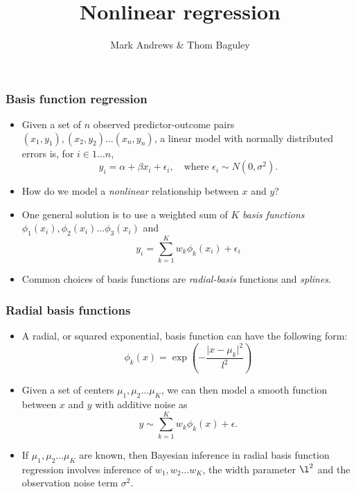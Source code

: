 \documentclass{slides}
\title[MCMC]{Nonlinear regression}
\author[Andrews]{Mark Andrews \& Thom Baguley}
\begin{document}
{
	\begin{frame}
		\titlepage
	\end{frame}
}


\begin{frame}
	\frametitle{Basis function regression}
	\begin{itemize}
	\item Given a set of $n$ observed predictor-outcome pairs $(x_1, y_1), (x_2, y_2) \ldots (x_n, y_n)$, a linear model with normally distributed errors is, for $i \in 1 \ldots n$,
		\[
			y_i = \alpha + \beta x_i + \epsilon_i, \quad \text{where $\epsilon_i \sim N(0, \sigma^2)$}.
		\]
	\item How do we model a \emph{nonlinear} relationship between $x$ and $y$?
	\item One general solution is to use a weighted sum of $K$ \emph{basis functions} $\phi_1(x_i), \phi_2(x_i) \ldots \phi_3(x_i)$
		and 
		\[
			y_i = \sum_{k=1}^K w_k \phi_k(x_i) + \epsilon_i
		\]
	\item Common choices of basis functions are \emph{radial-basis} functions and \emph{splines}.
	\end{itemize}
\end{frame}

\begin{frame}
	\frametitle{Radial basis functions}
	\begin{itemize}
		\item A radial, or squared exponential, basis function can have the following form:
			\[
				\phi_k(x) = \exp\left( - \frac{\vert x - \mu_k \vert^2}{l^2} \right)
			\]
		\item Given a set of centers $\mu_1, \mu_2 \ldots \mu_K$, we can then model a smooth function between $x$ and $y$ with additive noise as 
			\[
				y \sim \sum_{k=1}^K w_k \phi_k(x) + \epsilon.
			\]
		\item If $\mu_1, \mu_2 \ldots \mu_K$ are known, then Bayesian inference in radial basis function regression involves inference of $w_1, w_2 \ldots w_K$, the width parameter $\l^2$ and the observation noise term $\sigma^2$.
	\end{itemize}
\end{frame}
\end{document}
